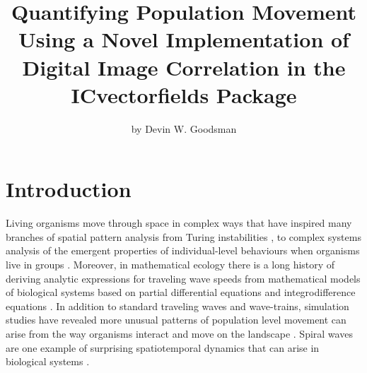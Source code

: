 \title{Quantifying Population Movement Using a Novel Implementation of
Digital Image Correlation in the ICvectorfields Package}
\author{by Devin W. Goodsman}

\maketitle


\hypertarget{introduction}{%
\section{Introduction}\label{introduction}}

Living organisms move through space in complex ways that have inspired
many branches of spatial pattern analysis from Turing instabilities
\citep{Alonso2002, Ruan1998}, to complex systems analysis of the
emergent properties of individual-level behaviours when organisms live
in groups \citep{Parrish1999, Johnson2009}. Moreover, in mathematical
ecology there is a long history of deriving analytic expressions for
traveling wave speeds from mathematical models of biological systems
based on partial differential equations
\citep[\citet{Skellam1951}]{Kolmogorov1937} and integrodifference
equations \citep{Kot1996}. In addition to standard traveling waves and
wave-trains, simulation studies have revealed more unusual patterns of
population level movement can arise from the way organisms interact and
move on the landscape \citep{Hassell1994}. Spiral waves are one example
of surprising spatiotemporal dynamics that can arise in biological
systems \citep{Hassell1991}.

